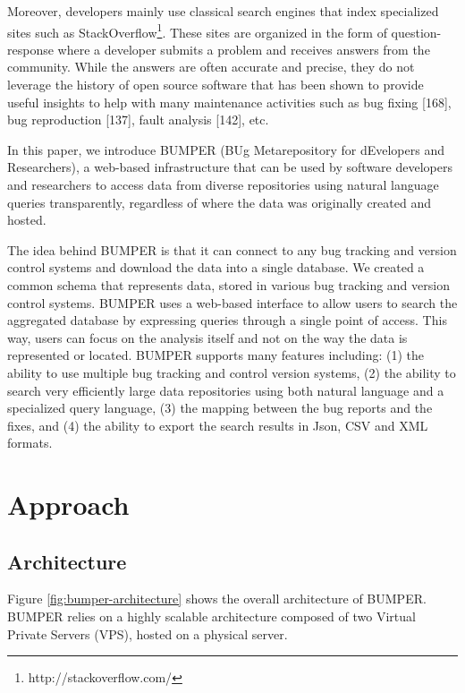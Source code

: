\documentclass[12pt]{report}
\begin{document}
Moreover, developers mainly use classical search engines that index
specialized sites such as
StackOverflow\footnote{http://stackoverflow.com/}. These sites are
organized in the form of question-response where a developer submits a
problem and receives answers from the community. While the answers are
often accurate and precise, they do not leverage the history of open
source software that has been shown to provide useful insights to help
with many maintenance activities such as bug fixing {[}168{]}, bug
reproduction {[}137{]}, fault analysis {[}142{]}, etc.

In this paper, we introduce BUMPER (BUg Metarepository for dEvelopers
and Researchers), a web-based infrastructure that can be used by
software developers and researchers to access data from diverse
repositories using natural language queries transparently, regardless of
where the data was originally created and hosted.

The idea behind BUMPER is that it can connect to any bug tracking and
version control systems and download the data into a single database. We
created a common schema that represents data, stored in various bug
tracking and version control systems. BUMPER uses a web-based interface
to allow users to search the aggregated database by expressing queries
through a single point of access. This way, users can focus on the
analysis itself and not on the way the data is represented or located.
BUMPER supports many features including: (1) the ability to use multiple
bug tracking and control version systems, (2) the ability to search very
efficiently large data repositories using both natural language and a
specialized query language, (3) the mapping between the bug reports and
the fixes, and (4) the ability to export the search results in Json, CSV
and XML formats.

\section{Approach}\label{approach}

\subsection{Architecture}\label{architecture}

Figure \ref{fig:bumper-architecture} shows the overall architecture of
BUMPER. BUMPER relies on a highly scalable architecture composed of two
Virtual Private Servers (VPS), hosted on a physical server.
\end{document}
